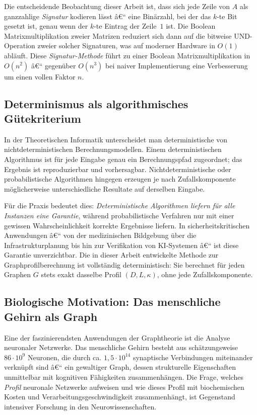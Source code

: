 ﻿\documentclass[a4paper,12pt]{article}
\theoremstyle{definition}
\begin{document}
	Die entscheidende Beobachtung dieser Arbeit ist, dass sich jede Zeile von $A$ als ganzzahlige \emph{Signatur} kodieren lässt â€“ eine Binärzahl, bei der das $k$-te Bit gesetzt ist, genau wenn der $k$-te Eintrag der Zeile~$1$ ist. Die Boolean Matrixmultiplikation zweier Matrizen reduziert sich dann auf die bitweise UND-Operation zweier solcher Signaturen, was auf moderner Hardware in $O(1)$ abläuft. Diese \emph{Signatur-Methode} führt zu einer Boolean Matrixmultiplikation in $O(n^2)$ â€“ gegenüber $O(n^3)$ bei naiver Implementierung eine Verbesserung um einen vollen Faktor $n$.

	\subsection{Determinismus als algorithmisches Gütekriterium}

	In der Theoretischen Informatik unterscheidet man deterministische von nichtdeterministischen Berechnungsmodellen. Einem deterministischen Algorithmus ist für jede Eingabe genau ein Berechnungspfad zugeordnet; das Ergebnis ist reproduzierbar und vorhersagbar. Nichtdeterministische oder probabilistische Algorithmen hingegen erzeugen je nach Zufallskomponente möglicherweise unterschiedliche Resultate auf derselben Eingabe.

	Für die Praxis bedeutet dies: \emph{Deterministische Algorithmen liefern für alle Instanzen eine Garantie}, während probabilistische Verfahren nur mit einer gewissen Wahrscheinlichkeit korrekte Ergebnisse liefern. In sicherheitskritischen Anwendungen â€“ von der medizinischen Bildgebung über die Infrastrukturplanung bis hin zur Verifikation von KI-Systemen â€“ ist diese Garantie unverzichtbar. Die in dieser Arbeit entwickelte Methode zur Graphprofilberechnung ist vollständig deterministisch: Sie berechnet für jeden Graphen $G$ stets exakt dasselbe Profil $(D, L, \kappa)$, ohne jede Zufallskomponente.

	\subsection{Biologische Motivation: Das menschliche Gehirn als Graph}

	Eine der faszinierendsten Anwendungen der Graphtheorie ist die Analyse neuronaler Netzwerke. Das menschliche Gehirn besteht aus schätzungsweise $86 \cdot 10^9$ Neuronen, die durch ca. $1{,}5 \cdot 10^{14}$ synaptische Verbindungen miteinander verknüpft sind â€“ ein gewaltiger Graph, dessen strukturelle Eigenschaften unmittelbar mit kognitiven Fähigkeiten zusammenhängen. Die Frage, welches \emph{Profil} neuronale Netzwerke aufweisen und wie dieses Profil mit biochemischen Kosten und Verarbeitungsgeschwindigkeit zusammenhängt, ist Gegenstand intensiver Forschung in den Neurowissenschaften.
\end{document}

